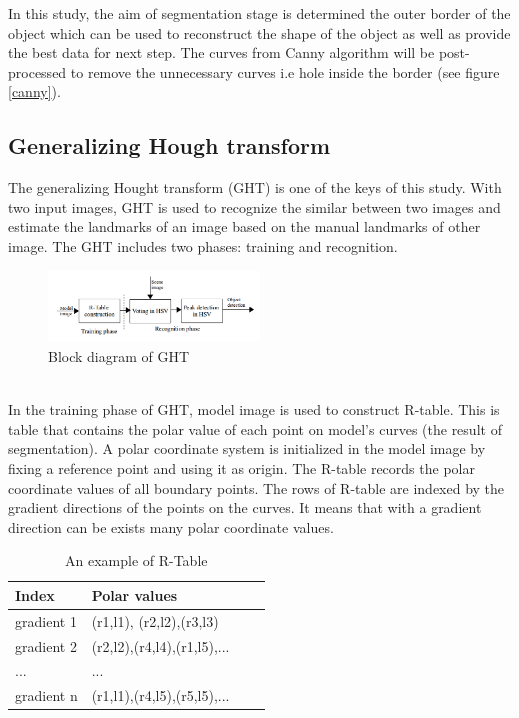 \documentclass[twoside,twocolumn,10pt]{article}
\begin{document}
In this study, the aim of segmentation stage is determined the outer border of the object which can be used to reconstruct the shape of the object as well as provide the best data for next step. The curves from Canny algorithm will be post-processed to remove the unnecessary curves i.e hole inside the border (see figure \ref{canny}). 
\subsection{Generalizing Hough transform}
The generalizing Hought transform (GHT)\cite{Ballard} is one of the keys of this study. With two input images, GHT is used to recognize the similar between two images and estimate the landmarks of an image based on the manual landmarks of other image. The GHT includes two phases: training and recognition.\\[0.2cm]
\begin{figure}[htb]
    \centering
    \includegraphics[width=0.5\textwidth]{./images/ghtdiagram}
    \caption{Block diagram of GHT}
    \label{fig:box}
\end{figure}~\\
In the training phase of GHT, model image is used to construct R-table. This is table that contains the polar value of each point on model's curves (the result of segmentation). A polar coordinate system is initialized in the model image by fixing a reference point and using it as origin. The R-table records the polar coordinate values of all boundary points. The rows of R-table are indexed by the gradient directions of the points on the curves. It means that with a gradient direction can be exists many polar coordinate values.
\begin{table}[htb]
	\centering
	\begin{tabular}{|l|l|l|l|}
	\hline
	Index & Polar values \\
	\hline
	gradient 1 & (r1,l1), (r2,l2),(r3,l3) \\
	\hline
	gradient 2 & (r2,l2),(r4,l4),(r1,l5),... \\
	\hline
	... & ...\\
	\hline
	gradient n & (r1,l1),(r4,l5),(r5,l5),... \\
	\hline
	\end{tabular}
	\caption{An example of R-Table}
\end{table}\\
\end{document}

